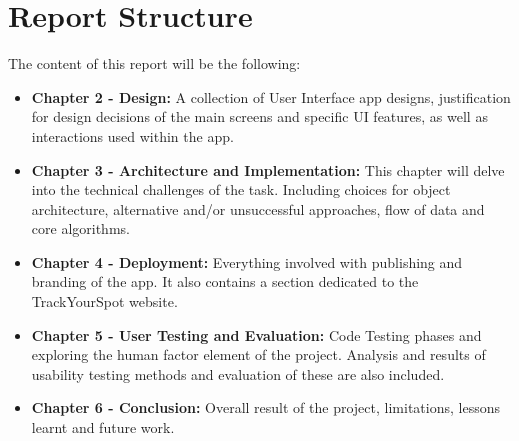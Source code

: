 \section{Report Structure}
The content of this report will be the following:
\begin{itemize}
    \item \textbf{Chapter 2 - Design: } A collection of User Interface app designs, justification for design decisions of the main screens and specific UI features, as well as interactions used within the app.
    \item \textbf{Chapter 3 - Architecture and Implementation: }This chapter will delve into the technical challenges of the task. Including choices for object architecture, alternative and/or unsuccessful approaches, flow of data and core algorithms.
    \item \textbf{Chapter 4 - Deployment: }Everything involved with publishing and branding of the app. It also contains a section dedicated to the TrackYourSpot website.
    \item \textbf{Chapter 5 - User Testing and Evaluation: } Code Testing phases and exploring the human factor element of the project. Analysis and results of usability testing methods and evaluation of these are also included.
    \item \textbf{Chapter 6 - Conclusion: }Overall result of the project, limitations, lessons learnt and future work.
\end{itemize}